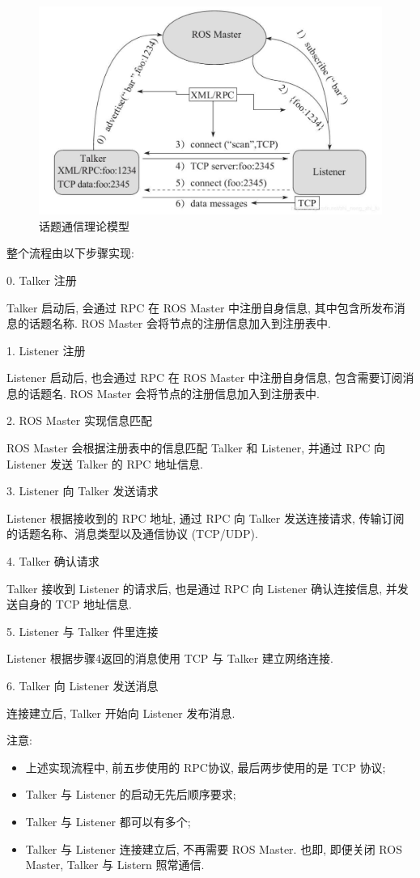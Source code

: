 \documentclass[openany, fontset=windowsold]{ctexbook}
\theoremstyle{kaiti}
\theoremstyle{normal}
\begin{document}
\begin{figure}[!ht]
  \centering
  \includegraphics[width=.75\textwidth]{ros_topic_communication.jpg}
  \caption{话题通信理论模型}
  \label{fig:ros_topic_communication}
\end{figure}

整个流程由以下步骤实现:

0. Talker 注册

Talker 启动后, 会通过 RPC 在 ROS Master 中注册自身信息, 其中包含所发布消息的话题名称. ROS Master 会将节点的注册信息加入到注册表中.

1. Listener 注册

Listener 启动后, 也会通过 RPC 在 ROS Master 中注册自身信息, 包含需要订阅消息的话题名. ROS Master 会将节点的注册信息加入到注册表中.

2. ROS Master 实现信息匹配

ROS Master 会根据注册表中的信息匹配 Talker 和 Listener, 并通过 RPC 向 Listener 发送 Talker 的 RPC 地址信息.

3. Listener 向 Talker 发送请求

Listener 根据接收到的 RPC 地址, 通过 RPC 向 Talker 发送连接请求, 传输订阅的话题名称、消息类型以及通信协议 (TCP/UDP).

4. Talker 确认请求

Talker 接收到 Listener 的请求后, 也是通过 RPC 向 Listener 确认连接信息, 并发送自身的 TCP 地址信息.

5. Listener 与 Talker 件里连接

Listener 根据步骤4返回的消息使用 TCP 与 Talker 建立网络连接.

6. Talker 向 Listener 发送消息

连接建立后, Talker 开始向 Listener 发布消息.

注意:
\begin{itemize}
  \item 上述实现流程中, 前五步使用的 RPC协议, 最后两步使用的是 TCP 协议;
  \item Talker 与 Listener 的启动无先后顺序要求;
  \item Talker 与 Listener 都可以有多个;
  \item Talker 与 Listener 连接建立后, 不再需要 ROS Master. 也即, 即便关闭 ROS Master, Talker 与 Listern 照常通信.
\end{itemize}
\end{document}
